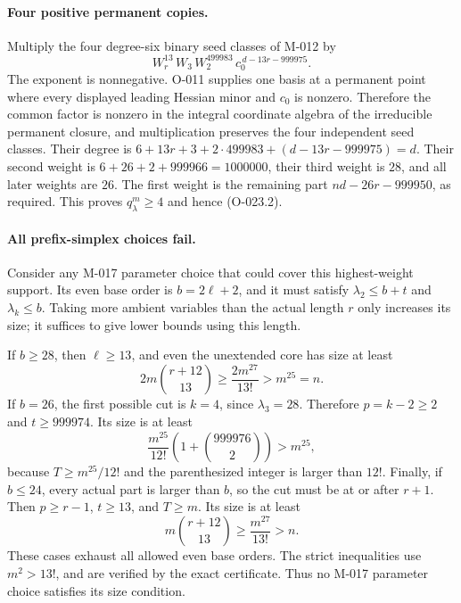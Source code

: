 \paragraph{Four positive permanent copies.}
Multiply the four degree-six binary seed classes of M-012
by
\[
             W_r^{13}\,W_3\,W_2^{499983}\,
                         c_0^{\,d-13r-999975}.          \tag{O-023.4}
\]
The exponent is nonnegative. O-011 supplies one basis
at a permanent point where every displayed leading
Hessian minor and $c_0$ is nonzero. Therefore the common
factor is nonzero in the integral coordinate algebra of
the irreducible permanent closure, and multiplication
preserves the four independent seed classes.
Their degree is
$6+13r+3+2\cdot499983+(d-13r-999975)=d$.
Their second weight is
$6+26+2+999966=1000000$, their third weight is $28$,
and all later weights are $26$. The first weight is
the remaining part $nd-26r-999950$, as required.
This proves $q^m_\lambda\geq4$ and hence (O-023.2).

\paragraph{All prefix-simplex choices fail.}
Consider any M-017 parameter choice that could cover this
highest-weight support. Its even base order is $b=2\ell+2$,
and it must satisfy $\lambda_2\leq b+t$ and
$\lambda_k\leq b$. Taking more ambient variables than
the actual length $r$ only increases its size; it suffices
to give lower bounds using this length.

If $b\geq28$, then $\ell\geq13$, and even the unextended
core has size at least
\[
     2m\binom{r+12}{13}
           \geq\frac{2m^{27}}{13!}>m^{25}=n.             \tag{O-023.5}
\]
If $b=26$, the first possible cut is $k=4$, since
$\lambda_3=28$. Therefore $p=k-2\geq2$ and
$t\geq999974$. Its size is at least
\[
 \frac{m^{25}}{12!}
       \left(1+\binom{999976}{2}\right)>m^{25},
                                                               \tag{O-023.6}
\]
because $T\geq m^{25}/12!$ and the parenthesized integer
is larger than $12!$.
Finally, if $b\leq24$, every actual part is larger than
$b$, so the cut must be at or after $r+1$.
Then $p\geq r-1$, $t\geq13$, and $T\geq m$.
Its size is at least
\[
                    m\binom{r+12}{13}
                          \geq\frac{m^{27}}{13!}>n.    \tag{O-023.7}
\]
These cases exhaust all allowed even base orders.
The strict inequalities use $m^2>13!$, and are verified
by the exact certificate. Thus no M-017 parameter choice
satisfies its size condition.

